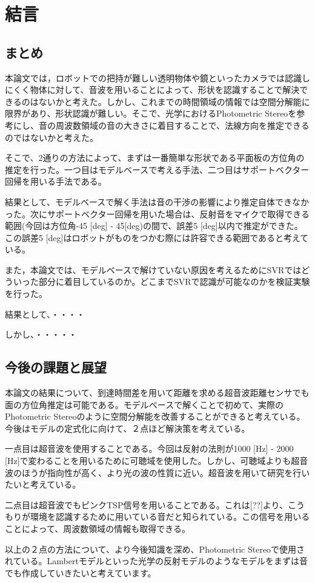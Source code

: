 \section{結言}
\label{chap:conclusion}

\subsection{まとめ}
\label{summary}
本論文では，ロボットでの把持が難しい透明物体や鏡といったカメラでは認識しにくく物体に対して、音波を用いることによって、形状を認識することで解決できるのはないかと考えた。しかし、これまでの時間領域の情報では空間分解能に限界があり、形状認識が難しい。そこで、光学におけるPhotometric Stereoを参考にし、音の周波数領域の音の大きさに着目することで、法線方向を推定できるのではないかと考えた。

そこで、2通りの方法によって、まずは一番簡単な形状である平面板の方位角の推定を行った。一つ目はモデルベースで考える手法、二つ目はサポートベクター回帰を用いる手法である。

結果として、モデルベースで解く手法は音の干渉の影響により推定自体できなかった。次にサポートベクター回帰を用いた場合は、反射音をマイクで取得できる範囲(今回は方位角-45 [deg] - 45[deg)の間で、誤差5 [deg]以内で推定ができた。この誤差5 [deg]はロボットがものをつかむ際には許容できる範囲であると考えている。

また，本論文では、モデルベースで解けていない原因を考えるためにSVRではどういった部分に着目しているのか。どこまでSVRで認識が可能なのかを検証実験を行った。

結果として、・・・・

しかし、・・・・・
\subsection{今後の課題と展望}
\label{future_work}
本論文の結果について、到達時間差を用いて距離を求める超音波距離センサでも面の方位角推定は可能である。モデルベースで解くことで初めて、実際のPhotometric Stereoのように空間分解能を改善することができると考えている。今後はモデルの定式化に向けて、２点ほど解決策を考えている。

一点目は超音波を使用することである。今回は反射の法則が1000 [Hz] - 2000 [Hz]で変わることを用いるために可聴域を使用した。しかし、可聴域よりも超音波のほうが指向性が高く、より光の波の性質に近い。超音波を用いて研究を行いたいと考えている。

二点目は超音波でもピンクTSP信号を用いることである。これは[??]より、こうもりが環境を認識するために用いている音だと知られている。この信号を用いることによって、周波数領域の情報も取得できる。

以上の２点の方法について、より今後知識を深め、Photometric Stereoで使用されている。Lambertモデルといった光学の反射モデルのようなモデルをまずは音でも作成していきたいと考えています。

\newpage
